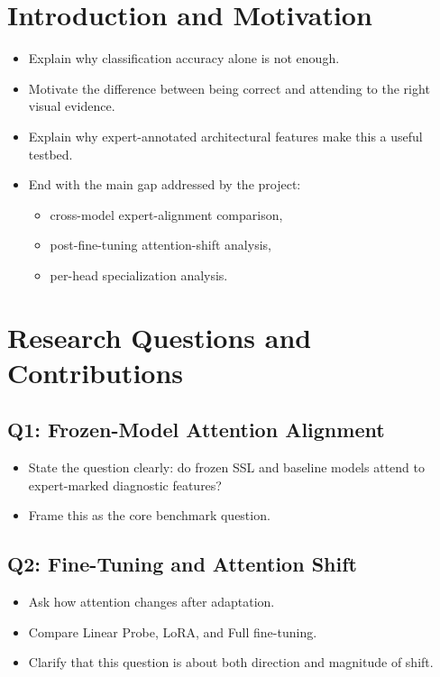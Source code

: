 \documentclass[11pt]{article}
\begin{document}
\section{Introduction and Motivation}

\begin{itemize}[leftmargin=1.5em]
    \item Explain why classification accuracy alone is not enough.
    \item Motivate the difference between being correct and attending to the
    right visual evidence.
    \item Explain why expert-annotated architectural features make this a
    useful testbed.
    \item End with the main gap addressed by the project:
    \begin{itemize}[leftmargin=1.5em]
        \item cross-model expert-alignment comparison,
        \item post-fine-tuning attention-shift analysis,
        \item per-head specialization analysis.
    \end{itemize}
\end{itemize}

\section{Research Questions and Contributions}

\subsection{Q1: Frozen-Model Attention Alignment}

\begin{itemize}[leftmargin=1.5em]
    \item State the question clearly: do frozen SSL and baseline models attend
    to expert-marked diagnostic features?
    \item Frame this as the core benchmark question.
\end{itemize}

\subsection{Q2: Fine-Tuning and Attention Shift}

\begin{itemize}[leftmargin=1.5em]
    \item Ask how attention changes after adaptation.
    \item Compare Linear Probe, LoRA, and Full fine-tuning.
    \item Clarify that this question is about both direction and magnitude of
    shift.
\end{itemize}
\end{document}
